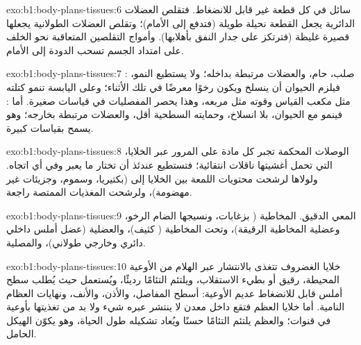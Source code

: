 \begin{solution}{exo:b1:body-plans-tissues:6}
سائل  في كل قطعة غير قابل للانضغاط. فتقلص العضلات
الدائرية يجعل القطعة نحيلة طويلة (فتدفع إلى الأمام)؛ وتقلص العضلات
الطولانية يجعلها قصيرة غليظة (فترتكز على جدار النفق بأهلابها).
وأمواج التقلصين المتعاقبة نحو الخلف على امتداد الجسم تسحب الدودة إلى
الأمام.
\end{solution}

\begin{solution}{exo:b1:body-plans-tissues:7}
: صلب، حام، والعضلات مرتبطة بداخله؛ ولا يستطيع النمو،
فيلزم الحيوان أن ينسلخ ويكون رخوًا معرضًا في تلك الأثناء؛ وعلى
اليابسة تنمو كتلته مثل مكعب القياس وقوته مثل مربعه، وهذا يحصر
المفصليات في قياسات صغيرة. أما : فينمو مع الحيوان، بلا
انسلاخ، وحمايته السطحية أقل، والعضلات مرتبطة بخارجه؛ وهو يسمح
بقياسات كبيرة.
\end{solution}

\begin{solution}{exo:b1:body-plans-tissues:8}
الوصلات المحكمة تجبر كل مادة على المرور عبر الخلايا، التي تحمل
أغشيتها ناقلات انتقائية؛ فتستطيع  عندئذ أن تختار ما يعبر وفي
أي اتجاه. ولولاها لرشحت محتويات اللمعة بين الخلايا إلى 
(بكتيريا، وسموم، وجزيئات غير مهضومة)، ولرشحت المغذيات الممتصة
راجعة.
\end{solution}

\begin{solution}{exo:b1:body-plans-tissues:9}
المعي الدقيق. المخاطية ( بزغابات، ونسيجها الضام الرخو، وعضلية
المخاطية الرقيقة)، وتحت المخاطية ( كثيف)، والعضلية (عضل
أملس داخلي دائري وخارجي طولاني)، والمصلية.
\end{solution}

\begin{solution}{exo:b1:body-plans-tissues:10}
خلايا الغضروف تتغذى بالانتشار عبر الهلام من الأوعية المحيطة، 
رقيق أو بطيء الاستقلاب، ويلتئم التئامًا رديئًا، ويُستعمل حيث يُطلب
سطح أملس قابل للانضغاط عديم الأوعية: أسطح المفاصل، والأذن، والأنف،
ونهايات العظام النامية. أما خلايا العظم فتقع داخل معدن لا ينتشر عبره
شيء ولا بد من تغذيتها بأوعية في قنوات؛ والعظم يلتئم التئامًا حسنًا
ويُعاد تشكيله طول الحياة، وهو يكوّن الهيكل الحامل.
\end{solution}

